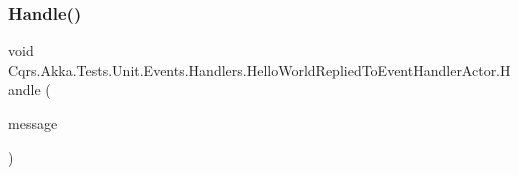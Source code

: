 \subsubsection{\texorpdfstring{Handle()}{Handle()}}
{\footnotesize\ttfamily void Cqrs.\+Akka.\+Tests.\+Unit.\+Events.\+Handlers.\+Hello\+World\+Replied\+To\+Event\+Handler\+Actor.\+Handle (\begin{DoxyParamCaption}\item[{\hyperlink{classCqrs_1_1Akka_1_1Tests_1_1Unit_1_1Events_1_1HelloWorldRepliedTo}{Hello\+World\+Replied\+To}}]{message }\end{DoxyParamCaption})}

